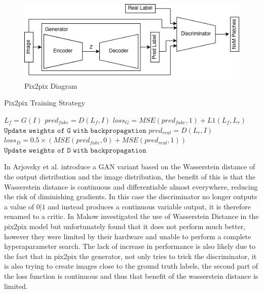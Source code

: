 \documentclass{UoYCSproject}
\begin{document}
\begin{figure}[h]
    \centering
    \includegraphics[width=\linewidth]{PatchGAN Diagram}
    \caption{Pix2pix Diagram}
    \label{fig:patchGANDiagram}
\end{figure}

\begin{algorithm}
    \caption{Pix2pix Training Strategy}\label{ALG:GAN}
    \begin{algorithmic}[1]
    \State
    \State $L_{f} = G(I)$
    \State
    \State $pred_{fake} = D(L_{f}, I) $
    \State $loss_G = MSE( pred_{fake}, 1 ) + L1(L_{f}, L_{r}) $
    \State $\texttt{Update weights of G with backpropagation}$
    \State
    \State $pred_{real} = D(L_{r}, I)$
    \State $loss_D = 0.5 \times  ( MSE( pred_{fake}, 0) + MSE( pred_{real}, 1) ) $
    \State $\texttt{Update weights of D with backpropagation}$
    \State
    \EndFor
    \EndFor
    \end{algorithmic}
\end{algorithm}
    

In \cite{arjovsky2017wasserstein} Arjovsky et al. introduce a GAN variant based on the Wasserstein distance of the output distribution and the image distribution, the benefit of this is that the Wasserstein distance is continuous and differentiable almost everywhere, reducing the risk of diminishing gradients. In this case the discriminator no longer outputs a value of $0|1$ and instead produces a continuous variable output, it is therefore renamed to a critic. In \cite{pix2pixwasserstein} Makow investigated the use of Wasserstein Distance in the pix2pix model but unfortunately found that it does not perform much better, however they were limited by their hardware and unable to perform a complete hyperaparameter search. The lack of increase in performance is also likely due to the fact that in pix2pix the generator, not only tries to trick the discriminator, it is also trying to create images close to the ground truth labels, the second part of the loss function is continuous and thus that benefit of the wasserstein distance is limited.
\end{document}
